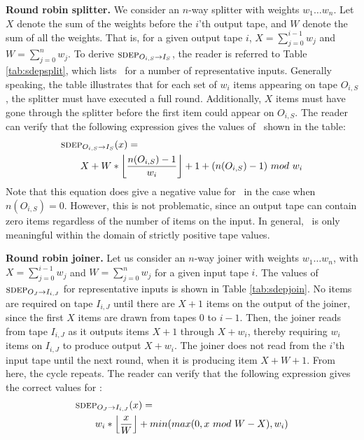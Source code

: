 {\bf Round robin splitter.}  We consider an $n$-way splitter with
weights $w_1 \dots w_n$.  Let $X$ denote the sum of the weights before
the $i$'th output tape, and $W$ denote the sum of all the weights.
That is, for a given output tape $i$, $X = \sum_{j=0}^{i-1} w_j$ and
$W = \sum_{j=0}^n w_j$.  To derive $\mi{I_S}{O_{i,S}}$, the reader is
referred to Table \ref{tab:sdepsplit}, which lists \sdep~for a number
of representative inputs.  Generally speaking, the table illustrates
that for each set of $w_i$ items appearing on tape $O_{i,S}$, the
splitter must have executed a full round.  Additionally, $X$ items
must have gone through the splitter before the first item could appear
on $O_{i,S}$.  The reader can verify that the following expression
gives the values of \sdep~shown in the table:
\begin{align}
\protect\label{eq:sdepsplit}
&\mi{I_S}{O_{i,S}}(x) = \\ &~~~~~~X +
W*\left\lfloor\frac{n(O_{i,S})-1}{w_i}\right\rfloor + 1 +
(n(O_{i,S})-1)~mod~w_i \nonumber
\end{align}
Note that this equation does give a negative value for \sdep~in the
case when $n(O_{i,S}) = 0$.  However, this is not problematic, since
an output tape can contain zero items regardless of the number of
items on the input.  In general, \sdep~is only meaningful within the
domain of strictly positive tape values.

{\bf Round robin joiner.}  Let us consider an $n$-way joiner with
weights $w_1 \dots w_n$, with $X = \sum_{j=0}^{i-1} w_j$ and $W =
\sum_{j=0}^n w_j$ for a given input tape $i$.  The values of
$\mi{I_{i,J}}{O_J}$ for representative inputs is shown in Table
\ref{tab:sdepjoin}.  No items are required on tape $I_{i,J}$ until
there are $X+1$ items on the output of the joiner, since the first $X$
items are drawn from tapes $0$ to $i-1$.  Then, the joiner reads from
tape $I_{i,J}$ as it outputs items $X+1$ through $X+w_i$, thereby
requiring $w_i$ items on $I_{i,J}$ to produce output $X+w_i$.  The
joiner does not read from the $i$'th input tape until the next round,
when it is producing item $X + W + 1$.  From here, the cycle repeats.
The reader can verify that the following expression gives the correct
values for \sdep:
\begin{align}
\protect\label{eq:sdepjoin}
&\mi{I_{i,J}}{O_J}(x) = \\ &~~~~~~w_i *
\left\lfloor\frac{x}{W}\right\rfloor + min(max(0, x~mod~W - X), w_i) \nonumber
\end{align}

